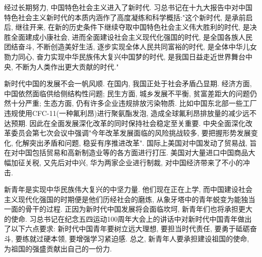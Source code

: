 经过长期努力, 中国特色社会主义进入了新时代. 习总书记在十九大报告中对中国特色社会主义新时代的本质内涵作了高度凝练和科学概括:"这个新时代, 是承前启后, 继往开来, 在新的历史条件下继续夺取中国特色社会主义伟大胜利的时代, 是决胜全面建成小康社会, 进而全面建设社会主义现代化强国的时代, 是全国各族人民团结奋斗, 不断创造美好生活, 逐步实现全体人民共同富裕的时代, 是全体中华儿女勠力同心, 奋力实现中华民族伟大复兴中国梦的时代, 是我国日益走近世界舞台中央, 不断为人类作出更大贡献的时代."\citep{Xi:19da}

新时代中国的发展不会一帆风顺. 在国内, 我国正处于社会矛盾凸显期. 经济方面, 中国依然面临供给侧结构性问题;\citep{Cheng:Revolution}
民生方面, 城乡发展不平衡, 贫富差距大的问题仍然十分严重;
生态方面, 仍有许多企业违规排放污染物质. 比如中国东北部一些工厂违规使用CFC-11(一种氟利昂)进行聚氨酯发泡, 造成全球氟利昂排放量的减少远不达预期.\citep{Nature:2018,Nature:2019}
因此在全面发展深化改革的同时保持社会稳定至关重要. 中央全面深化改革委员会第七次会议中强调"今年改革发展面临的风险挑战较多, 要把握形势发展变化, 化解突出矛盾和问题, 稳妥有序推进改革".\citep{Xi:Revolution}
国际上美国对中国发动了贸易战, 旨在对中国包括贸易和高新制造业等的各方面进行打压. 美国对大量进口中国商品大幅加征关税, 又先后对中兴, 华为两家企业进行制裁, 对中国经济带来了不小的冲击.

新青年是实现中华民族伟大复兴的中坚力量. 他们现在正在上学, 而中国建设社会主义现代化强国的时期便是他们历经社会的磨炼, 从象牙塔中的青年蜕变为能独当一面的骨干的过程. 正因为新时代中国发展将会面临坎坷, 新青年们也将承担更大的使命. 习总书记在纪念五四运动100周年大会上的讲话中对新时代中国青年做出了以下六点要求: 新时代中国青年要树立远大理想, 要担当时代责任, 要勇于砥砺奋斗, 要练就过硬本领, 要增强学习紧迫感.\citep{Xi:Teenagers}
总之, 新青年人要承担建设祖国的使命, 为祖国的强盛贡献出自己的一份力.
